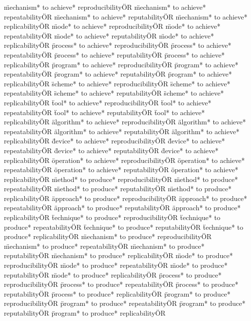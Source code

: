 \documentclass[
10pt, %
a4paper, %
oneside, %
headinclude,footinclude, %
BCOR5mm, %
]{scrartcl}
\begin{document}
\"mechanism* to achieve* reproducibility\" OR \"mechanism* to achieve* repeatability\" OR \"mechanism* to achieve* reputability\" OR \"mechanism* to achieve* replicability\" OR 
\"mode* to achieve* reproducibility\" OR \"mode* to achieve* repeatability\" OR \"mode* to achieve* reputability\" OR \"mode* to achieve* replicability\" OR 
\"process* to achieve* reproducibility\" OR \"process* to achieve* repeatability\" OR \"process* to achieve* reputability\" OR \"process* to achieve* replicability\" OR 
\"program* to achieve* reproducibility\" OR \"program* to achieve* repeatability\" OR \"program* to achieve* reputability\" OR \"program* to achieve* replicability\" OR 
\"scheme* to achieve* reproducibility\" OR \"scheme* to achieve* repeatability\" OR \"scheme* to achieve* reputability\" OR \"scheme* to achieve* replicability\" OR 
\"tool* to achieve* reproducibility\" OR \"tool* to achieve* repeatability\" OR \"tool* to achieve* reputability\" OR \"tool* to achieve* replicability\" OR 
\"algorithm* to achieve* reproducibility\" OR \"algorithm* to achieve* repeatability\" OR \"algorithm* to achieve* reputability\" OR \"algorithm* to achieve* replicability\" OR 
\"device* to achieve* reproducibility\" OR \"device* to achieve* repeatability\" OR \"device* to achieve* reputability\" OR \"device* to achieve* replicability\" OR 
\"operation* to achieve* reproducibility\" OR \"operation* to achieve* repeatability\" OR \"operation* to achieve* reputability\" OR \"operation* to achieve* replicability\" OR 
\"method* to produce* reproducibility\" OR \"method* to produce* repeatability\" OR \"method* to produce* reputability\" OR \"method* to produce* replicability\" OR 
\"approach* to produce* reproducibility\" OR \"approach* to produce* repeatability\" OR \"approach* to produce* reputability\" OR \"approach* to produce* replicability\" OR 
\"technique* to produce* reproducibility\" OR \"technique* to produce* repeatability\" OR \"technique* to produce* reputability\" OR \"technique* to produce* replicability\" OR 
\"mechanism* to produce* reproducibility\" OR \"mechanism* to produce* repeatability\" OR \"mechanism* to produce* reputability\" OR \"mechanism* to produce* replicability\" OR 
\"mode* to produce* reproducibility\" OR \"mode* to produce* repeatability\" OR \"mode* to produce* reputability\" OR \"mode* to produce* replicability\" OR 
\"process* to produce* reproducibility\" OR \"process* to produce* repeatability\" OR \"process* to produce* reputability\" OR \"process* to produce* replicability\" OR 
\"program* to produce* reproducibility\" OR \"program* to produce* repeatability\" OR \"program* to produce* reputability\" OR \"program* to produce* replicability\" OR 
\end{document}
